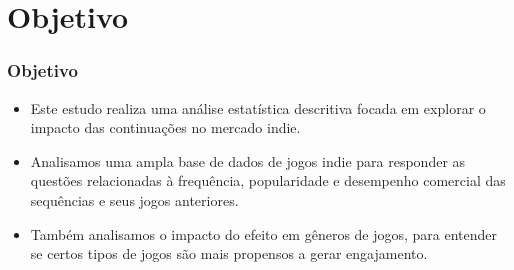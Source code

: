 \section{Objetivo}
\begin{frame}
\frametitle{Objetivo}
\justifying

\begin{itemize}
    \item  Este estudo realiza uma análise estatística descritiva focada
    em explorar o impacto das continuações no mercado indie.
    \vspace{0.2cm}

    \item Analisamos uma ampla base de dados de jogos indie para responder as 
    questões relacionadas à frequência, 
    popularidade e desempenho comercial das sequências e seus jogos anteriores. 
    \item Também analisamos o impacto do efeito em gêneros de jogos, para entender 
    se certos tipos de jogos são mais propensos a gerar engajamento.
    \vspace{0.2cm}

\end{itemize}    
\end{frame}